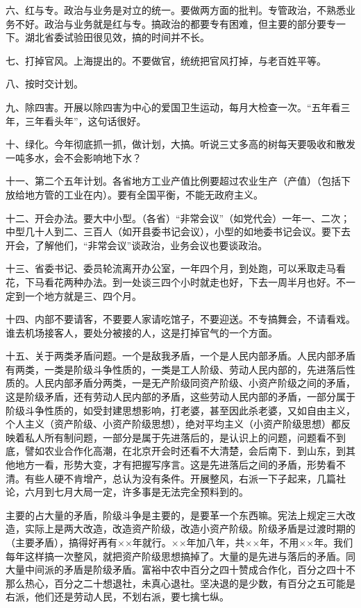 六、红与专。政治与业务是对立的统一。要做两方面的批判。专管政治，不熟悉业务不好。政治与业务就是红与专。搞政治的都要专有困难，但主要的部分要专一下。湖北省委试验田很见效，搞的时间并不长。

七、打掉官风。上海提出的。不要做官，统统把官风打掉，与老百姓平等。

八、按时交计划。

九、除四害。开展以除四害为中心的爱国卫生运动，每月大检查一次。“五年看三年，三年看头年”，这句话很好。

十、绿化。今年彻底抓一抓，做计划，大搞。听说三丈多高的树每天要吸收和散发一吨多水，会不会影响地下水？

十一、第二个五年计划。各省地方工业产值比例要超过农业生产（产值）（包括下放给地方管的工业在内）。要有全国平衡，不能无政府主义。

十二、开会办法。要大中小型。（各省）“非常会议”（如党代会）一年一、二次；中型几十人到二、三百人（如开县委书记会议），小型的如地委书记会议。要下去开会，了解他们，“非常会议”谈政治，业务会议也要谈政治。

十三、省委书记、委员轮流离开办公室，一年四个月，到处跑，可以釆取走马看花，下马看花两种办法。到一处谈三四个小时就走也好，下去一周半月也好。不一定到一个地方就是三、四个月。

十四、内部不要请客，不要要人家请吃馆子，不要迎送。不专搞舞会，不请看戏。谁去机场接客人，要处分被接的人，这是打掉官气的一个方面。

十五、关于两类矛盾问题。一个是敌我矛盾，一个是人民内部矛盾。人民内部矛盾有两类，一类是阶级斗争性质的，一类是工人阶级、劳动人民内部的，先进落后性质的。人民内部矛盾分两类，一是无产阶级同资产阶级、小资产阶级之间的矛盾，这是阶级矛盾，还有劳动人民内部的矛盾，这些劳动人民内部的矛盾，一部分属于阶级斗争性质的，如受封建思想影响，打老婆，甚至因此杀老婆，又如自由主义，个人主义（资产阶级、小资产阶级思想），绝对平均主义（小资产阶级思想）都反映着私人所有制问题，一部分是属于先进落后的，是认识上的问题，问题看不到底，譬如农业合作化高潮，在北京开会时还看不大清楚，会后南下．到山东，到其他地方一看，形势大变，才有把握写序言。这是先进落后之间的矛盾，形势看不清。有些人硬不肯增产，总认为没有条件。开展整风，右派一下子起来，几篇社论，六月到七月大局一定，许多事是无法完全预料到的。

主要的占大量的矛盾，阶级斗争是主要的，是要革一个东西嘛。宪法上规定三大改造，实际上是两大改造，改造资产阶级，改造小资产阶级。阶级矛盾是过渡时期的（主要矛盾），搞得好再有××年就行。××年加八年，共××年，不用××年。我们每年这样搞一次整风，就把资产阶级思想搞掉了。大量的是先进与落后的矛盾。同大量中间派的矛盾是阶级矛盾。富裕中农中百分之四十赞成合作化，百分之四十不那么热心，百分之二十想退社，未真心退社。坚决退的是少数，有百分之五可能是右派，他们还是劳动人民，不划右派，要七擒七纵。


